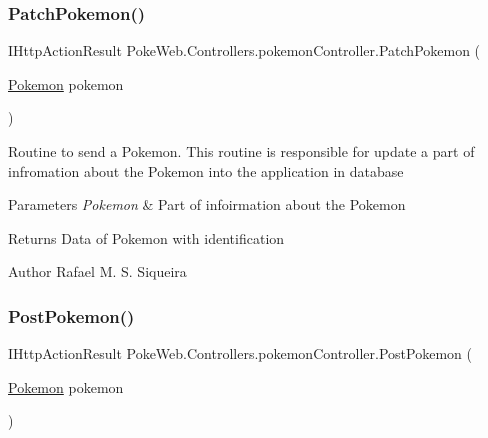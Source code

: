 \subsubsection{\texorpdfstring{Patch\+Pokemon()}{PatchPokemon()}}
{\footnotesize\ttfamily I\+Http\+Action\+Result Poke\+Web.\+Controllers.\+pokemon\+Controller.\+Patch\+Pokemon (\begin{DoxyParamCaption}\item[{\mbox{\hyperlink{class_poke_web_1_1_models_1_1_pokemon}{Pokemon}}}]{pokemon }\end{DoxyParamCaption})\hspace{0.3cm}{\ttfamily [inline]}}

Routine to send a Pokemon. This routine is responsible for update a part of infromation about the Pokemon into the application in database


\begin{DoxyParams}{Parameters}
{\em Pokemon} & Part of infoirmation about the Pokemon \\
\hline
\end{DoxyParams}
\begin{DoxyReturn}{Returns}
Data of Pokemon with identification 
\end{DoxyReturn}
\begin{DoxyAuthor}{Author}
Rafael M. S. Siqueira 
\end{DoxyAuthor}
\mbox{\label{class_poke_web_1_1_controllers_1_1pokemon_controller_a426f7fbc4f620f8f7b6f144f10233540}} 
\subsubsection{\texorpdfstring{Post\+Pokemon()}{PostPokemon()}}
{\footnotesize\ttfamily I\+Http\+Action\+Result Poke\+Web.\+Controllers.\+pokemon\+Controller.\+Post\+Pokemon (\begin{DoxyParamCaption}\item[{\mbox{\hyperlink{class_poke_web_1_1_models_1_1_pokemon}{Pokemon}}}]{pokemon }\end{DoxyParamCaption})\hspace{0.3cm}{\ttfamily [inline]}}

